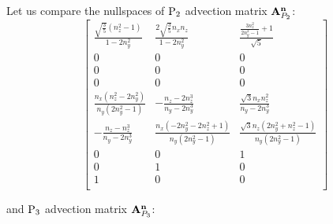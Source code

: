 \newpage
\begin{remark} 
Let us compare the nullspaces of $\PN[2]$ advection matrix $\mat{A}_{P_2}^{\bn}$: 
$$
\left[
\begin{array}{ccc}
 \frac{\sqrt{\frac{3}{5}} \left(n_z^2-1\right)}{1-2 n_y^2} & \frac{2 \sqrt{\frac{3}{5}} n_x n_z}{1-2 n_y^2} & \frac{\frac{3 n_z^2}{2 n_y^2-1}+1}{\sqrt{5}} \\
 0 & 0 & 0 \\
 0 & 0 & 0 \\
 0 & 0 & 0 \\
 \frac{n_x \left(n_z^2-2 n_y^2\right)}{n_y \left(2 n_y^2-1\right)} & -\frac{n_z-2 n_z^3}{n_y-2 n_y^3} & \frac{\sqrt{3} n_x n_z^2}{n_y-2 n_y^3} \\
 -\frac{n_z-n_z^3}{n_y-2 n_y^3} & \frac{n_x \left(-2 n_y^2-2 n_z^2+1\right)}{n_y \left(2 n_y^2-1\right)} & \frac{\sqrt{3} n_z \left(2 n_y^2+n_z^2-1\right)}{n_y \left(2 n_y^2-1\right)} \\
 0 & 0 & 1 \\
 0 & 1 & 0 \\
 1 & 0 & 0 \\
\end{array}
\right]
$$

\noindent and $\PN[3]$ advection matrix $\mat{A}_{P_3}^{\bn}$:


\end{remark}
